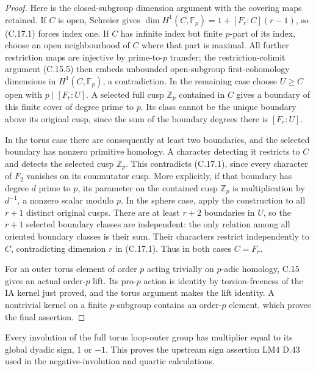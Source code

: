 \begin{proof}
Here is the closed-subgroup dimension argument with the
covering maps retained.  If $C$ is open, Schreier gives
$\dim H^1(C,\mathbb F_p)=1+[F_r:C](r-1)$, so (C.17.1)
forces index one.  If $C$ has infinite index but finite
$p$-part of its index, choose an open neighbourhood of
$C$ where that part is maximal.  All further restriction
maps are injective by prime-to-$p$ transfer; the
restriction-colimit argument (C.15.5) then embeds
unbounded open-subgroup first-cohomology dimensions in
$H^1(C,\mathbb F_p)$, a contradiction.  In the remaining
case choose $U\geq C$ open with $p\mid[F_r:U]$.
A selected full cusp $\mathbb Z_p$ contained in $C$
gives a boundary of this finite cover of degree prime
to $p$.  Its class cannot be the unique boundary above
its original cusp, since the sum of the boundary
degrees there is $[F_r:U]$.

In the torus case there are consequently at least two
boundaries, and the selected boundary has nonzero
primitive homology.  A character detecting it restricts
to $C$ and detects the selected cusp $\mathbb Z_p$.
This contradicts (C.17.1), since every character of
$F_2$ vanishes on its commutator cusp.  More explicitly,
if that boundary has degree $d$ prime to $p$, its
parameter on the contained cusp $\mathbb Z_p$ is
multiplication by $d^{-1}$, a nonzero scalar modulo $p$.
In the sphere case, apply the construction to all
$r+1$ distinct original cusps.  There are at least
$r+2$ boundaries in $U$, so the $r+1$ selected boundary
classes are independent: the only relation among all
oriented boundary classes is their sum.  Their characters
restrict independently to $C$, contradicting dimension
$r$ in (C.17.1).  Thus in both cases $C=F_r$.

For an outer torus element of order $p$ acting trivially
on $p$-adic homology, C.15 gives an actual order-$p$
lift.  Its pro-$p$ action is identity by torsion-freeness
of the IA kernel just proved, and the torus argument
makes the lift identity.  A nontrivial kernel on a
finite $p$-subgroup contains an order-$p$ element,
which proves the final assertion.
\end{proof}

Every involution of the full torus loop-outer group has
multiplier equal to its global dyadic sign, $1$ or $-1$.
This proves the upstream sign assertion LM4 D.43 used
in the negative-involution and quartic calculations.

